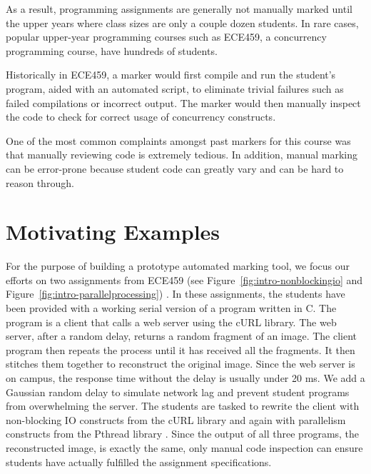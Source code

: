 As a result, programming assignments are generally not manually marked until the upper years where class sizes are only a couple dozen students. In rare cases, popular upper-year programming courses such as ECE459, a concurrency programming course, have hundreds of students.

Historically in ECE459, a marker would first compile and run the student's program, aided with an automated script, to eliminate trivial failures such as failed compilations or incorrect output. The marker would then manually inspect the code to check for correct usage of concurrency constructs.

One of the most common complaints amongst past markers for this course was that manually reviewing code is extremely tedious. In addition, manual marking can be error-prone because student code can greatly vary and can be hard to reason through.

\section{Motivating Examples}
\label{sec:intro-motivating-examples}

For the purpose of building a prototype automated marking tool, we focus our efforts on two assignments from ECE459 (see Figure~\ref{fig:intro-nonblockingio} and Figure~\ref{fig:intro-parallelprocessing}) \cite{uwaterloo-ece459}. In these assignments, the students have been provided with a working serial version of a program written in C. The program is a client that calls a web server using the cURL library. The web server, after a random delay, returns a random fragment of an image. The client program then repeats the process until it has received all the fragments. It then stitches them together to reconstruct the original image. Since the web server is on campus, the response time without the delay is usually under 20 ms. We add a Gaussian random delay to simulate network lag and prevent student programs from overwhelming the server. The students are tasked to rewrite the client with non-blocking IO constructs from the cURL library \cite{lib-curl} and again with parallelism constructs from the Pthread library \cite{lib-pthread}. Since the output of all three programs, the reconstructed image, is exactly the same, only manual code inspection can ensure students have actually fulfilled the assignment specifications.

